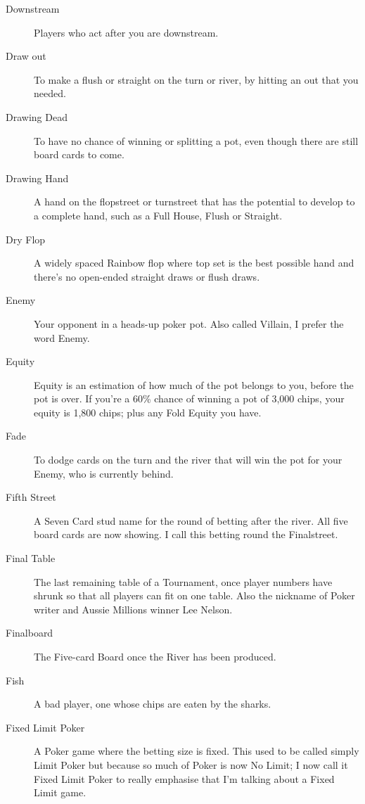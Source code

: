 \begin{description}

\item[Downstream] Players who act after you are downstream.

\item[Draw out] To make a flush or straight on the turn or river, by
hitting an out that you needed.

\item[Drawing Dead] To have no chance of winning or splitting a pot,
even though there are still board cards to come.

\item[Drawing Hand] A hand on the flopstreet or turnstreet that has
the potential to develop to a complete hand, such as a Full House,
Flush or Straight.

\item[Dry Flop] A widely spaced Rainbow flop where top set is the best
possible hand and there's no open-ended straight draws or flush
draws.

\item[Enemy] Your opponent in a heads-up poker pot. Also called
Villain, I prefer the word Enemy.

\item[Equity] Equity is an estimation of how much of the pot belongs
to you, before the pot is over. If you're a 60\% chance of winning a
pot of 3,000 chips, your equity is 1,800 chips; plus any Fold Equity
you have.

\item[Fade] To dodge cards on the turn and the river that will win the
pot for your Enemy, who is currently behind.

\item[Fifth Street] A Seven Card stud name for the round of betting
after the river. All five board cards are now showing. I call this betting
round the Finalstreet.

\item[Final Table] The last remaining table of a Tournament, once
player numbers have shrunk so that all players can fit on one
table. Also the nickname of Poker writer and Aussie Millions winner
Lee Nelson.

\item[Finalboard] The Five-card Board once the River has been
produced.

\item[Fish] A bad player, one whose chips are eaten by the sharks.

\item[Fixed Limit Poker] A Poker game where the betting size is
fixed. This used to be called simply Limit Poker but because so much
of Poker is now No Limit; I now call it Fixed Limit Poker to really
emphasise that I'm talking about a Fixed Limit game.


\end{description}
